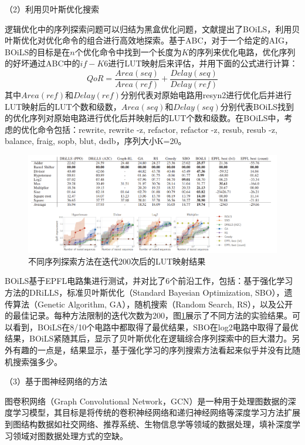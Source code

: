（2）利用贝叶斯优化搜索

逻辑优化中的序列探索问题可以归结为黑盒优化问题，文献\cite{LS:BOiLS}提出了BOiLS，利用贝叶斯优化对优化命令的组合进行高效地探索。基于ABC，对于一个给定的AIG，BOiLS的目标是在$n$个优化命令中找到一个长度为$K$的序列来优化电路，优化序列的好坏通过ABC中的$if -K 6$进行LUT映射后来评估，并用下面的公式进行计算：
\begin{equation}
    \label{LS:BOiLS:Eq:QoR}
    QoR = \frac{Area(seq)}{Area(ref)} + \frac{Delay(seq)}{Delay(ref)}
\end{equation}
其中$Area(ref)$和$Delay(ref)$分别代表对原始电路用resyn2进行优化后并进行LUT映射后的LUT个数和级数，$Area(seq)$和$Delay(seq)$分别代表BOiLS找到的优化序列对原始电路进行优化后并映射后的LUT个数和级数。在BOiLS中，考虑的优化命令包括：rewrite, rewrite -z, refactor, refactor -z, resub, resub -z, balance, fraig, sopb, blut, dsdb，序列大小K=20。

\begin{figure}[!htbp]
    \centering
    \includegraphics[width=\linewidth]{./figs/LS-BOiLS-results.png}
    \caption{不同序列探索方法在迭代200次后的LUT映射结果}
    \label{LS:BOiLS:Fig:results}
\end{figure}

BOiLS基于EPFL电路集\cite{LS:EPFL_benchs_iwls,LS:EPFL_benchs_github}进行测试，并对比了6个前沿工作，包括：基于强化学习方法的DRiLLS\cite{LS:DRiLLS}，标准贝叶斯优化（Standard Bayesian Optimization, SBO），遗传算法（Genetic Algorithm, GA），随机搜索（Random Search, RS），以及公开的最佳记录。每种方法限制的迭代次数为200，图\ref{LS:BOiLS:Fig:results}展示了不同方法的实验结果。可以看到，BOiLS在8/10个电路中都取得了最优结果，SBO在log2电路中取得了最优结果，BOiLS紧随其后，显示了贝叶斯优化在逻辑综合序列探索中的巨大潜力。另外有趣的一点是，结果显示，基于强化学习的序列搜索方法看起来似乎并没有比随机搜索强多少。

（3）基于图神经网络的方法

图卷积网络（Graph Convolutional Network，GCN）是一种用于处理图数据的深度学习模型，其目标是将传统的卷积神经网络和递归神经网络等深度学习方法扩展到图结构数据如社交网络、推荐系统、生物信息学等领域的数据处理，填补深度学习领域对图数据处理方式的空缺。

